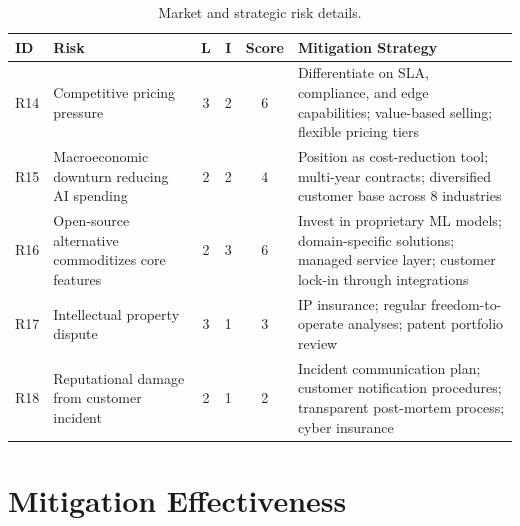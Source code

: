 \documentclass[
    language=english,
    doctype=risk-assessment,
    institution=none,
]{../../omnilatex}
\begin{document}
\begin{table}[h]
    \centering
    \small
    \begin{tabular}{llcccl}
        \toprule
        \textbf{ID} & \textbf{Risk} & \textbf{L} & \textbf{I} & \textbf{Score} & \textbf{Mitigation Strategy} \\
        \midrule
        R14 & Competitive pricing pressure & 3 & 2 & 6 &
            Differentiate on SLA, compliance, and edge capabilities;
            value-based selling; flexible pricing tiers \\
        R15 & Macroeconomic downturn reducing AI spending & 2 & 2 & 4 &
            Position as cost-reduction tool; multi-year contracts;
            diversified customer base across 8 industries \\
        R16 & Open-source alternative commoditizes core features & 2 & 3 & 6 &
            Invest in proprietary ML models; domain-specific solutions;
            managed service layer; customer lock-in through integrations \\
        R17 & Intellectual property dispute & 3 & 1 & 3 &
            IP insurance; regular freedom-to-operate analyses; patent
            portfolio review \\
        R18 & Reputational damage from customer incident & 2 & 1 & 2 &
            Incident communication plan; customer notification procedures;
            transparent post-mortem process; cyber insurance \\
        \bottomrule
    \end{tabular}
    \caption{Market and strategic risk details.}
\end{table}

\section{Mitigation Effectiveness}
\end{document}
